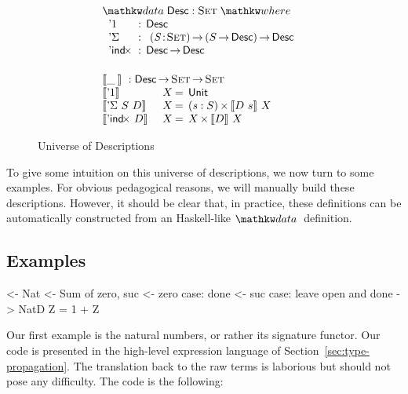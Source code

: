 \begin{figure}

\[\stk{
\begin{array}{ll}
\stk{
\data \Desc : \Set \where \\
\;\;\begin{array}{@{}l@{\::\:\:}l@{\quad}l}
    \DUnit          & \Desc \\
    \DSigma         & \PI{\V{S}}{\Set} \PIS{S \To \Desc} \Desc \\
    \DIndx          & \Desc \To \Desc
\end{array}
}
\vspace{0.2in}
\\
\stk{
\descop{\_\:}{} : \Desc \To \Set \To \Set \\
\begin{array}{@{}ll@{\:=\:\:}ll}
\descop{\DUnit}{& X}        &  \Unit                                       \\
\descop{\DSigma{S}{D}}{& X} &  \SIGMAS{\V{s} : S}{\descop{D~s}{X}}         \\
\descop{\DIndx{D}}{& X}     &  \TIMES{X}{\descop{D}{X}}
\end{array}
}
\end{array}
}\]


\caption{Universe of Descriptions}
\label{fig:desc_universe}

\end{figure}

To give some intuition on this universe of descriptions, we now turn
to some examples. For obvious pedagogical reasons, we will manually
build these descriptions. However, it should be clear that, in
practice, these definitions can be automatically constructed from an
Haskell-like $\data$ definition.

\subsection{Examples}
\label{sec:desc-examples}

\begin{wstructure}
<- Nat
    <- Sum of zero, suc
    <- zero case: done
    <- suc case: leave open and done
    -> NatD Z = 1 + Z
\end{wstructure}

Our first example is the natural numbers, or rather its signature
functor. Our code is presented in the high-level expression language
of Section~\ref{sec:type-propagation}. The translation back to the raw
terms is laborious but should not pose any difficulty. The code is the
following:

